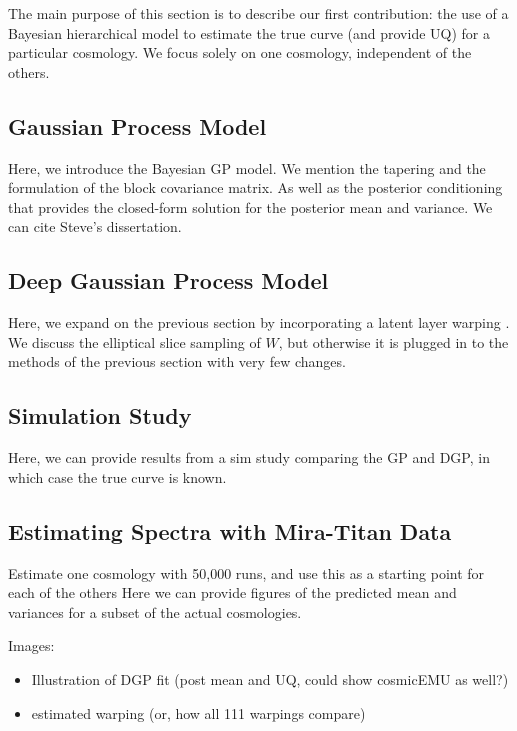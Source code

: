 \documentclass[11pt]{article}
\begin{document}
The main purpose of this section is to describe our first contribution: the use of a Bayesian hierarchical model to estimate the true curve (and provide UQ) for a particular cosmology.  We focus solely on one cosmology, independent of the others.

\subsection{Gaussian Process Model}

Here, we introduce the Bayesian GP model.  We mention the tapering and the formulation of the block covariance matrix.  As well as the posterior conditioning that provides the closed-form solution for the posterior mean and variance.  We can cite Steve's dissertation.

\subsection{Deep Gaussian Process Model}

Here, we expand on the previous section by incorporating a latent layer warping \citep{damianou2013deep}.  We discuss the elliptical slice sampling of $W$, but otherwise it is plugged in to the methods of the previous section with very few changes.

\subsection{Simulation Study}
\label{subsec:sim}

Here, we can provide results from a sim study comparing the GP and DGP, in which case the true curve is known.

\subsection{Estimating Spectra with Mira-Titan Data}
\label{subsec:mira_fit}

Estimate one cosmology with 50,000 runs, and use this as a starting point for each of the others
Here we can provide figures of the predicted mean and variances for a subset of the actual cosmologies.

Images:
\begin{itemize}
    \item Illustration of DGP fit (post mean and UQ, could show cosmicEMU as well?)
    \item estimated warping (or, how all 111 warpings compare)
\end{itemize}
\end{document}
